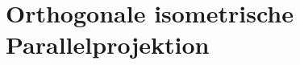 
\setcounter{H-section}{18}
\renewcommand*\thesection{H\Nummerierung{\arabic{H-section}}}
\section{Orthogonale isometrische Parallelprojektion}